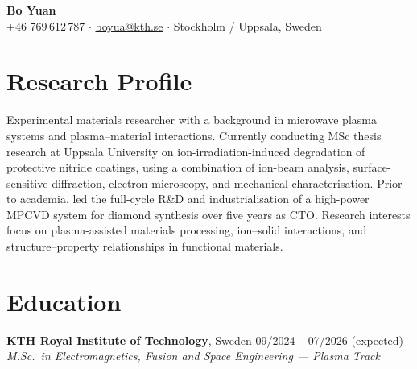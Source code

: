 \documentclass[a4paper,11pt]{article}
\begin{document}
\begin{center}
    {\LARGE \textbf{Bo Yuan}} \\
    \vspace{0.15cm}
    +46 769\,612\,787 \enspace $\cdot$ \enspace
    \href{mailto:boyua@kth.se}{boyua@kth.se} \enspace $\cdot$ \enspace
    Stockholm / Uppsala, Sweden
\end{center}

\vspace{0.3cm}

\section*{Research Profile}

Experimental materials researcher with a background in microwave plasma systems and
plasma--material interactions. Currently conducting MSc thesis research at Uppsala
University on ion-irradiation-induced degradation of protective nitride coatings,
using a combination of ion-beam analysis, surface-sensitive diffraction, electron
microscopy, and mechanical characterisation. Prior to academia, led the full-cycle
R\&D and industrialisation of a high-power MPCVD system for diamond synthesis over
five years as CTO. Research interests focus on plasma-assisted materials processing,
ion--solid interactions, and structure--property relationships in functional materials.

\section*{Education}

\noindent\textbf{KTH Royal Institute of Technology}, Sweden \hfill 09/2024 -- 07/2026 (expected) \\
\textit{M.Sc.\ in Electromagnetics, Fusion and Space Engineering --- Plasma Track}
\end{document}
